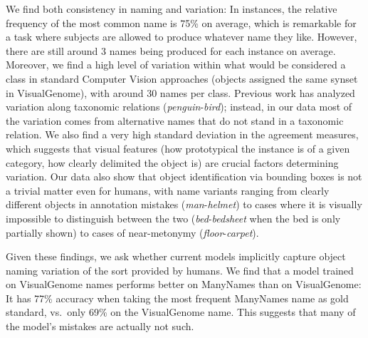 We find both consistency in naming and variation: In instances, the relative frequency of the most common name is 75\% on average, which is remarkable for a task where subjects are allowed to produce whatever name they like.
However, there are still around 3 names being produced for each instance on average.
Moreover, we find a high level of variation within what would be considered a class in standard Computer Vision approaches (objects assigned the same synset in VisualGenome), with around 30 names per class.
Previous work has analyzed variation along taxonomic relations (\textit{penguin}-\textit{bird}); instead, in our data most of the variation comes from alternative names that do not stand in a taxonomic relation.
We also find a very high standard deviation in the agreement measures, which suggests that visual features (how prototypical the instance is of a given category, how clearly delimited the object is) are crucial factors determining variation.
Our data also show that object identification via bounding boxes is not a trivial matter even for humans, with name variants ranging from clearly different objects in annotation mistakes (\textit{man}-\textit{helmet}) to cases where it is visually impossible to distinguish between the two (\textit{bed}-\textit{bedsheet} when the bed is only partially shown) to cases of near-metonymy (\textit{floor}-\textit{carpet}).

Given these findings, we ask whether current models implicitly capture object naming variation of the sort provided by humans.
We find that a model trained on VisualGenome names performs better on ManyNames than on VisualGenome: It has 77\% accuracy when taking the most frequent ManyNames name as gold standard, vs.\ only 69\% on the VisualGenome name.
This suggests that many of the model's mistakes are actually not such.



